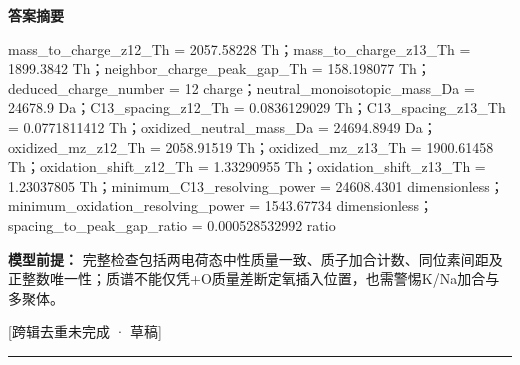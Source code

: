 \documentclass[UTF8,11pt,a4paper]{ctexart}
\begin{document}
\noindent\textbf{答案摘要}\par
mass\_to\_charge\_z12\_Th = 2057.58228 Th；mass\_to\_charge\_z13\_Th = 1899.3842 Th；neighbor\_charge\_peak\_gap\_Th = 158.198077 Th；deduced\_charge\_number = 12 charge；neutral\_monoisotopic\_mass\_Da = 24678.9 Da；C13\_spacing\_z12\_Th = 0.0836129029 Th；C13\_spacing\_z13\_Th = 0.0771811412 Th；oxidized\_neutral\_mass\_Da = 24694.8949 Da；oxidized\_mz\_z12\_Th = 2058.91519 Th；oxidized\_mz\_z13\_Th = 1900.61458 Th；oxidation\_shift\_z12\_Th = 1.33290955 Th；oxidation\_shift\_z13\_Th = 1.23037805 Th；minimum\_C13\_resolving\_power = 24608.4301 dimensionless；minimum\_oxidation\_resolving\_power = 1543.67734 dimensionless；spacing\_to\_peak\_gap\_ratio = 0.000528532992 ratio\par
\noindent\textbf{模型前提：}
完整检查包括两电荷态中性质量一致、质子加合计数、同位素间距及正整数唯一性；质谱不能仅凭+O质量差断定氧插入位置，也需警惕K/Na加合与多聚体。\par
\noindent\textcolor{red!65!black}{[跨辑去重未完成 · 草稿]} \par
\medskip\hrule\medskip
{}
\end{document}
